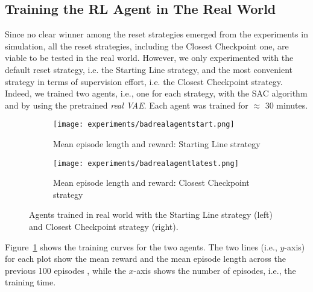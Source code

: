 
\subsection{Training the RL Agent in The Real World}

Since no clear winner among the reset strategies emerged from the experiments in simulation, all the reset strategies, including the Closest Checkpoint one, are viable to be tested in the real world. However, we only experimented with the default reset strategy, i.e. the Starting Line strategy, and the most convenient strategy in terms of supervision effort, i.e. the Closest Checkpoint strategy. Indeed, we trained two agents, i.e., one for each strategy, with the SAC algorithm and by using the pretrained \textit{real VAE}. Each agent was trained for $\approx$ 30 minutes.

\begin{figure}[h]
	\centering
	\begin{subfigure}{.5\linewidth}
		\centering
		\texttt{[image: experiments/badrealagentstart.png]}
		\caption{Mean episode length and reward: Starting Line strategy}\label{fig:rlen}
	\end{subfigure}%
	\hfill
	\begin{subfigure}{.5\linewidth}
		\centering
		\texttt{[image: experiments/badrealagentlatest.png]}
		\caption{Mean episode length and reward: Closest Checkpoint strategy}\label{fig:rrew}
	\end{subfigure}
	\caption{Agents trained in real world with the Starting Line strategy (left) and Closest Checkpoint strategy (right). }
	\label{fig:realresult}
\end{figure}

Figure~\ref{fig:rlen} shows the training curves for the two agents. The two lines (i.e., $y$-axis) for each plot show the mean reward and the mean episode length across the previous 100 episodes , while the $x$-axis shows the number of episodes, i.e., the training time.

